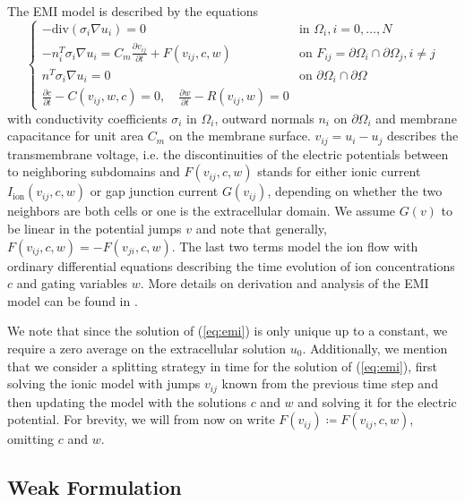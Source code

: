 The EMI model is described by the equations
\begin{equation}
\label{eq:emi}
    \begin{cases}
        -\text{div}(\sigma_i \nabla u_i) = 0 & \text{in } \Omega_i, i = 0,\dots,N \\
        -n_i^T\sigma_i\nabla u_i = C_m\frac{\partial v_{ij}}{\partial t} + F(v_{ij}, c, w) & \text{on } F_{ij} = \partial\Omega_i \cap \partial\Omega_j, i \neq j \\
        n^T\sigma_i\nabla u_i = 0 & \text{on } \partial\Omega_i \cap \partial\Omega \\
        \frac{\partial c}{\partial t}-C(v_{ij}, w, c) = 0, \quad \frac{\partial w}{\partial t}-R(v_{ij},w)=0&
    \end{cases}
\end{equation}
with conductivity coefficients $\sigma_i$ in $\Omega_i$, outward normals $n_i$ on $\partial \Omega_i$ and membrane capacitance for unit area $C_m$ on the membrane surface. $v_{ij} = u_i - u_j$ describes the transmembrane voltage, i.e. the discontinuities of the electric potentials between to neighboring subdomains and $F(v_{ij}, c, w)$ stands for either ionic current $I_{\text{ion}}(v_{ij},c,w)$ or gap junction current $G(v_{ij})$, depending on whether the two neighbors are both cells or one is the extracellular domain. We assume $G(v)$ to be linear in the potential jumps $v$ and note that generally, $F(v_{ij}, c, w) = - F(v_{ji}, c, w)$. The last two terms model the ion flow with ordinary differential equations describing the time evolution of ion concentrations $c$ and gating variables $w$. More details on derivation and analysis of the EMI model can be found in \cite{EMI-1, EMI-4, veneroni2006micro}.

We note that since the solution of (\ref{eq:emi}) is only unique up to a constant, we require a zero average on the extracellular solution $u_0$. Additionally, we mention that we consider a splitting strategy in time for the solution of (\ref{eq:emi}), first solving the ionic model with jumps $v_{ij}$ known from the previous time step and then updating the model with the solutions $c$ and $w$ and solving it for the electric potential. For brevity, we will from now on write $F(v_{ij}) \coloneqq F(v_{ij}, c, w)$, omitting $c$ and $w$.

\subsection{Weak Formulation}

